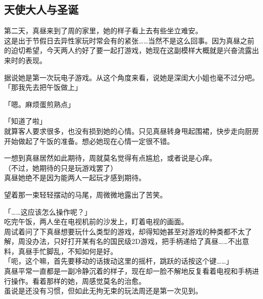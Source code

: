 
\subsection{天使大人与圣诞}

第二天，真昼来到了周的家里，她的样子看上去有些坐立难安。\\

这是出于节假日去异性家玩时常会有的紧张……当然不是这么回事。因为真昼之前的迫切希望，今天两人约好了要一起打游戏，她现在这副模样大概就是兴奋流露出来时的表现。

据说她是第一次玩电子游戏。从这个角度来看，说她是深闺大小姐也毫不过分吧。\\

「那我先去把午饭做上」

「嗯。麻烦蛋煎熟点」

「知道了啦」\\

就算客人要求很多，也没有损到她的心情。只见真昼转身甩起围裙，快步走向厨房开始做起了午饭的准备。想必她现在心情一定很不错。

一想到真昼居然如此期待，周就莫名觉得有点尴尬，或者说是心痒。\\

（不过，她期待的只是玩游戏罢了）\\

真昼她绝不是因为能两人一起玩才感到期待。

望着那一束轻轻摆动的马尾，周微微地露出了苦笑。\\

\vspace{2\baselineskip}

「……这应该怎么操作呢？」\\

吃完午饭，两人坐在电视机前的沙发上，盯着电视的画面。\\

周试着问了下真昼想要玩什么类型的游戏，却得知她甚至对游戏的种类都不太了解，周没办法，只好打开某有名的国民级2D游戏，把手柄递给了真昼……不出意料，真昼手忙脚乱，不知如何是好。\\

「呃，这个嘛，首先要移动的话拨动这里的摇杆，跳跃的话按这个键……」\\

真昼平常一直都是一副冷静沉着的样子，现在却一脸不解地反复看着电视和手柄进行操作。看着那样的她，周感觉莫名的治愈。\\

虽说是还没有习惯，但如此无拘无束的玩法周还是第一次见到。\\

